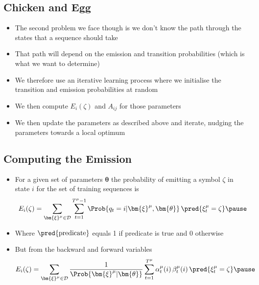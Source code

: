 
\begin{slide}
\section{Chicken and Egg}

\begin{PauseHighLight}
  \begin{itemize}
  \item The second problem we face though is we don't know the path through the
    states that a sequence should take\pause
  \item That path will depend on the emission and transition
    probabilities (which is what we want to determine)\pause
  \item We therefore use an iterative learning process where we
    initialise the transition and emission probabilities at random\pause
  \item We then compute $E_i(\zeta)$ and $A_{ij}$ for those
    parameters\pause
  \item We then update the parameters as described above and iterate,
    nudging the parameters towards a local optimum\pause
  \end{itemize}
\end{PauseHighLight}

\end{slide}


\begin{slide}
\section[-1]{Computing the Emission}

\begin{PauseHighLight}
  \begin{itemize}
  \item For a given set of parameters $\bm{\theta}$ the probability of
    emitting a symbol $\zeta$ in state $i$ for the set of training
    sequences is
    \begin{align*}
      E_i(\zeta) = \sum_{\bm{\xi}^\mu\in\mathcal{D}} \sum_{t=1}^{T^\mu-1}
      \Prob{q_t=i| \bm{\xi}^\mu, \bm{\theta}} \, \pred{\xi_t^\mu = \zeta}\pause
    \end{align*}
  \item Where $\pred{\text{predicate}}$ equals 1 if predicate is true
    and 0 otherwise\pause
  \item But from the backward and forward variables
    \begin{align*}
      E_i(\zeta) = \sum_{\bm{\xi}^\mu\in\mathcal{D}} 
      \frac{1}{\Prob{\bm{\xi}^\mu|\bm{\theta}}}\sum_{t=1}^{T^\mu}
      \alpha_t^\mu(i)\,\beta_t^\mu(i)\, \pred{\xi_t^\mu = \zeta}\pause
    \end{align*}
  \end{itemize}
\end{PauseHighLight}

\end{slide}


